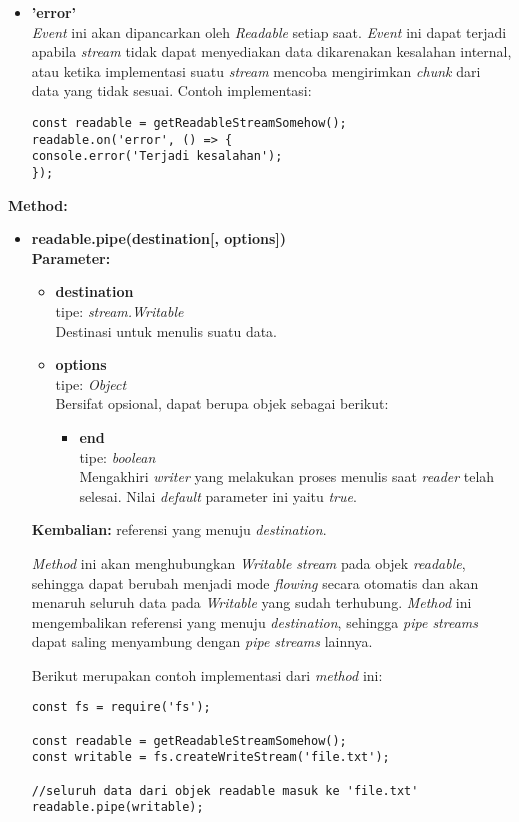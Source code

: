 \begin{enumerate}
\begin{itemize}
\begin{itemize}
			\item \textbf{'error'} \\ \textit{Event} ini akan dipancarkan oleh \textit{Readable} setiap saat. \textit{Event} ini dapat terjadi apabila \textit{stream} tidak dapat menyediakan data dikarenakan kesalahan internal, atau ketika implementasi suatu \textit{stream} mencoba mengirimkan \textit{chunk} dari data yang tidak sesuai. Contoh implementasi:
\begin{lstlisting}
const readable = getReadableStreamSomehow();
readable.on('error', () => {
console.error('Terjadi kesalahan');
});
\end{lstlisting}
			
			
		\end{itemize}
		
		\textbf{Method:}
		\begin{itemize}
			\item \textbf{readable.pipe(destination[, options])} \\ \textbf{Parameter:}
			\begin{itemize}
				\item \textbf{destination} \\tipe: \textit{stream.Writable} \\ Destinasi untuk menulis suatu data.
				\item \textbf{options} \\tipe: \textit{Object} \\ Bersifat opsional, dapat berupa objek sebagai berikut:
				\begin{itemize}
					\item \textbf{end} \\tipe: \textit{boolean} \\ Mengakhiri \textit{writer} yang melakukan proses menulis saat \textit{reader} telah selesai. Nilai \textit{default} parameter ini yaitu \textit{true}.
				\end{itemize}
			\end{itemize}
			\textbf{Kembalian:} referensi yang menuju \textit{destination}.
			
			\textit{Method} ini akan menghubungkan \textit{Writable stream} pada objek \textit{readable}, sehingga dapat berubah menjadi mode \textit{flowing} secara otomatis dan akan menaruh seluruh data pada \textit{Writable} yang sudah terhubung. \textit{Method} ini mengembalikan referensi yang menuju \textit{destination}, sehingga \textit{pipe streams} dapat saling menyambung dengan \textit{pipe streams} lainnya.
			
			Berikut merupakan contoh implementasi dari \textit{method} ini:
\begin{lstlisting}
const fs = require('fs');
			
const readable = getReadableStreamSomehow();
const writable = fs.createWriteStream('file.txt');
			
//seluruh data dari objek readable masuk ke 'file.txt'
readable.pipe(writable); 
\end{lstlisting}
			
		\end{itemize}
	\end{itemize}
\end{enumerate}


